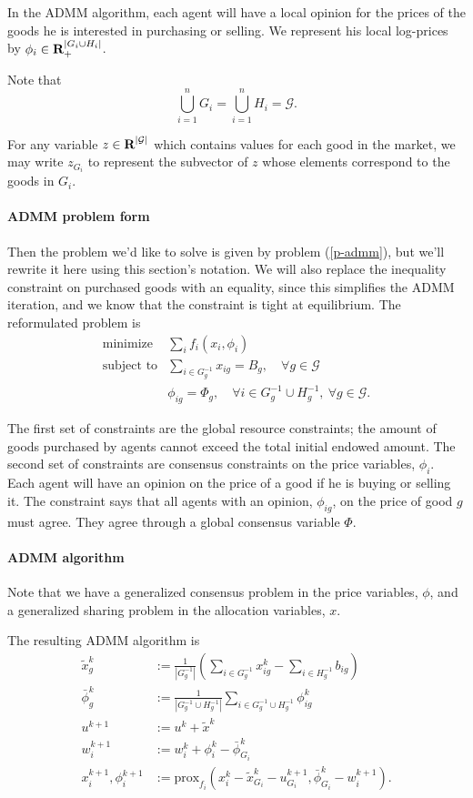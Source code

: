 \documentclass[12pt]{article}
\begin{document}
In the ADMM algorithm, each agent will have a local opinion for the prices
of the goods he is interested in purchasing or selling.
We represent his local log-prices
by $\phi_i \in {\mbox{\bf R}}_+^{|G_i \cup H_i|}$.

Note that
\[
\bigcup_{i=1}^n G_i = \bigcup_{i=1}^n H_i = \mathcal{G}.
\]

For any variable $z \in {\mbox{\bf R}}^{|\mathcal{G}|}$ which contains values for
each good in the market, we may write $z_{G_i}$ to represent the subvector
of $z$ whose elements correspond to the goods in $G_i$.

\paragraph{ADMM problem form} Then the problem we'd like to solve is given by
problem (\ref{p-admm}), but we'll rewrite it here using this section's notation.
We will also replace the inequality constraint on purchased goods with an
equality, since this simplifies the ADMM iteration, and we know that
the constraint is tight at equilibrium.
The reformulated problem is
\[
\begin{array}{ll}
\mbox{minimize} & \sum_i f_i(x_i, \phi_i) \\
\mbox{subject to} & \sum\limits_{i \in G^{-1}_g} x_{ig} = B_g,\quad \forall g \in \mathcal{G}\\
& \phi_{ig} = \Phi_g,\quad \forall i \in G^{-1}_g \cup H^{-1}_g,\ \forall g \in \mathcal{G}.
\end{array}
\]

The first set of constraints are the global resource constraints; the amount of
goods purchased by agents cannot exceed the total initial endowed amount.
The second set of constraints are consensus constraints on the price variables,
$\phi_i$.
Each agent will have an opinion on the price of a good if he is buying or selling it.
The constraint says that all agents with an opinion, $\phi_{ig}$, on the price
of good $g$ must agree.
They agree through a global consensus variable $\Phi$.


\paragraph{ADMM algorithm}
Note that we have a generalized consensus problem in the price variables,
$\phi$, and a generalized sharing problem in the allocation variables, $x$.

The resulting ADMM algorithm is 
\begin{align}
\label{a-xtild}
\tilde{x}^k_g &:= \frac{1}{|G^{-1}_g|} \left( \sum_{i \in G^{-1}_g} x^k_{ig} - \sum_{i \in H^{-1}_g} b_{ig}\right)\\
\label{a-phibar}
\bar{\phi}^k_g &:= \frac{1}{ |G^{-1}_g \cup H^{-1}_g| } \sum_{i \in G^{-1}_g \cup H^{-1}_g}\phi^k_{ig}\\
u^{k+1} &:= u^k + \tilde{x}^k\\
w_i^{k+1} &:= w_i^k + \phi^k_i - \bar{\phi}^k_{G_i}\\
\label{a-prox}
x_i^{k+1}, \phi_i^{k+1} &:= \mbox{prox}_{f_i}(x_i^k - \tilde{x}^k_{G_i} - u^{k+1}_{G_i},
\bar{\phi}^k_{G_i} - w_i^{k+1}).
\end{align}
\end{document}
